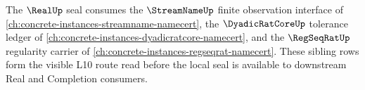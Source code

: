 The $\RealUp$ seal consumes the $\StreamNameUp$ finite observation interface of
\autoref{ch:concrete-instances-streamname-namecert}, the $\DyadicRatCoreUp$
tolerance ledger of \autoref{ch:concrete-instances-dyadicratcore-namecert},
and the $\RegSeqRatUp$ regularity carrier of
\autoref{ch:concrete-instances-regseqrat-namecert}. These sibling rows form
the visible L10 route read before the local seal is available to downstream
Real and Completion consumers.

